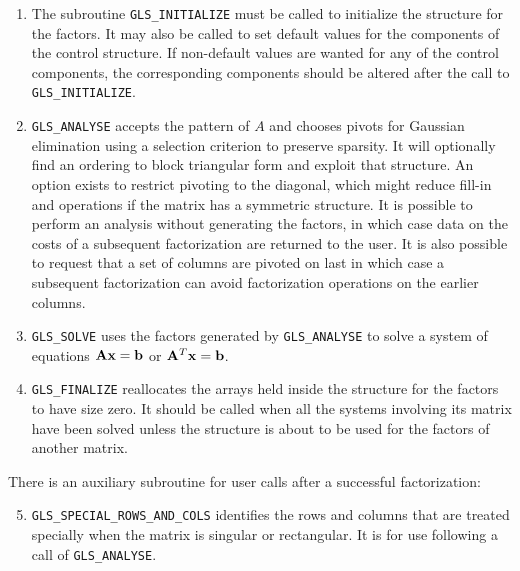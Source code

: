\documentclass{galahad}
\newcommand{\packagename}{GLS}
\begin{document}
\begin{enumerate}

\item The subroutine {\tt \packagename\_INITIALIZE} must be 
called to initialize the
structure for the factors. It may also be called to set default values
for the components of the control structure. If non-default values are
wanted for any of the control components, the corresponding components
should be altered after the call to {\tt \packagename\_INITIALIZE}.
 
\item {\tt \packagename\_ANALYSE} accepts the pattern of $A$ and chooses
pivots for Gaussian elimination using a selection criterion to preserve
sparsity.  It will optionally find an ordering to block triangular form
and exploit that structure. An option exists to restrict pivoting to the
diagonal, which might reduce fill-in and operations if the matrix has a
symmetric structure. It is possible to perform an analysis without
generating the factors, in which case data on the costs of a subsequent
factorization are returned to the user.  It is also possible to request
that a set of columns are pivoted on last in which case a subsequent
factorization can avoid factorization operations on the earlier columns.

\item {\tt \packagename\_SOLVE} uses the factors generated by 
{\tt \packagename\_ANALYSE} to
solve a system of equations ${\mathbf{A}} {\mathbf{x}} = {\mathbf{b}}$ or ${\mathbf{A}}^T {\mathbf{x}} = {\mathbf{b}}$.

\item {\tt \packagename\_FINALIZE} reallocates the arrays held inside
the structure for the factors to have size zero. It should be called
when all the systems involving its matrix have been solved unless the
structure is about to be used for the factors of another matrix.

\end{enumerate}

\noindent There is an auxiliary subroutine for user calls after a 
successful factorization:

\begin{enumerate}
\setcounter{enumi}{4}

\item {\tt \packagename\_SPECIAL\_ROWS\_AND\_COLS} identifies the rows
and columns that are treated specially when the matrix is singular or
rectangular.  It is for use following a call of {\tt \packagename\_ANALYSE}.

\end{enumerate}
\end{document}
